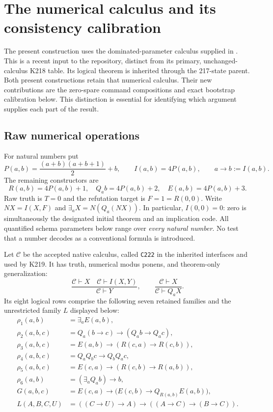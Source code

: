 \section{The numerical calculus and its consistency calibration}
\label{sec:native-calibration}

The present construction uses the dominated-parameter calculus supplied in
.  This is a recent input to the
repository, distinct from its primary, unchanged-calculus K218 table.
Its logical theorem is inherited through the 217-state parent. Both present constructions retain that numerical calculus. Their new contributions are the zero-spare command compositions and exact bootstrap calibration below.  This distinction is essential for identifying
which argument supplies each part of the result.

\subsection{Raw numerical operations}

For natural numbers put
\[
 P(a,b)=\frac{(a+b)(a+b+1)}2+b,
 \qquad I(a,b)=4P(a,b),\qquad a\to b:=I(a,b).
\]
The remaining constructors are
\[
 R(a,b)=4P(a,b)+1,\quad Q_a b=4P(a,b)+2,
 \quad E(a,b)=4P(a,b)+3.
\]
Raw truth is $T=0$ and the refutation target is $F=1=R(0,0)$.
Write $NX=I(X,F)$ and $\exists_a X=N(Q_a(NX))$.  In particular,
$I(0,0)=0$: zero is simultaneously the designated initial theorem and
an implication code.  All quantified schema parameters below range over
\emph{every natural number}.  No test that a number decodes as a conventional
formula is introduced.

Let $\mathcal C$ be the accepted native calculus, called \texttt{C222} in
the inherited interfaces and used by K219.  It has truth, numerical modus
ponens, and theorem-only generalization:
\[
 \frac{\mathcal C\vdash X\quad \mathcal C\vdash I(X,Y)}
      {\mathcal C\vdash Y},
 \qquad
 \frac{\mathcal C\vdash X}{\mathcal C\vdash Q_aX}.
\]
Its eight logical rows comprise the following seven retained families
and the unrestricted family $L$ displayed below:
\begin{align*}
 \rho_1(a,b)&=\exists_a E(a,b),\\
 \rho_2(a,b,c)&=Q_a(b\to c)\to(Q_ab\to Q_ac),\\
 \rho_3(a,b,c)&=E(a,b)\to(R(c,a)\to R(c,b)),\\
 \rho_4(a,b,c)&=Q_aQ_bc\to Q_bQ_ac,\\
 \rho_5(a,b,c)&=E(c,a)\to(R(c,b)\to R(a,b)),\\
 \rho_6(a,b)&=(\exists_a Q_ab)\to b,\\
 G(a,b,c)&=E(c,a)\to\bigl(E(c,b)\to Q_{R(a,b)}E(a,b)\bigr),\\
 L(A,B,C,U)&=((C\to U)\to A)\to((A\to C)\to(B\to C)).
\end{align*}

